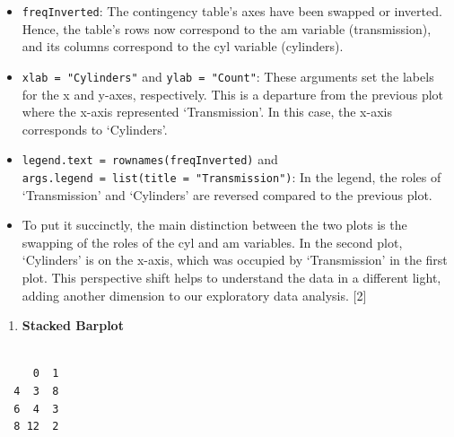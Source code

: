 \documentclass[
  letterpaper,
  DIV=11,
  numbers=noendperiod]{scrreport}
\newenvironment{Shaded}{\begin{snugshade}}{\end{snugshade}}
\newcommand{\CommentTok}[1]{\textcolor[rgb]{0.37,0.37,0.37}{#1}}
\newcommand{\FunctionTok}[1]{\textcolor[rgb]{0.28,0.35,0.67}{#1}}
\newcommand{\NormalTok}[1]{\textcolor[rgb]{0.00,0.23,0.31}{#1}}
\newcommand{\OtherTok}[1]{\textcolor[rgb]{0.00,0.23,0.31}{#1}}
\newcommand{\SpecialCharTok}[1]{\textcolor[rgb]{0.37,0.37,0.37}{#1}}
\providecommand{\tightlist}{%
  \setlength{\itemsep}{0pt}\setlength{\parskip}{0pt}}\usepackage{longtable,booktabs,array}
\begin{document}
\begin{itemize}
\item
  \texttt{freqInverted}: The contingency table's axes have been swapped
  or inverted. Hence, the table's rows now correspond to the am variable
  (transmission), and its columns correspond to the cyl variable
  (cylinders).
\item
  \texttt{xlab\ =\ "Cylinders"} and \texttt{ylab\ =\ "Count"}: These
  arguments set the labels for the x and y-axes, respectively. This is a
  departure from the previous plot where the x-axis represented
  `Transmission'. In this case, the x-axis corresponds to `Cylinders'.
\item
  \texttt{legend.text\ =\ rownames(freqInverted)} and
  \texttt{args.legend\ =\ list(title\ =\ "Transmission")}: In the
  legend, the roles of `Transmission' and `Cylinders' are reversed
  compared to the previous plot.
\item
  To put it succinctly, the main distinction between the two plots is
  the swapping of the roles of the cyl and am variables. In the second
  plot, `Cylinders' is on the x-axis, which was occupied by
  `Transmission' in the first plot. This perspective shift helps to
  understand the data in a different light, adding another dimension to
  our exploratory data analysis. {[}2{]}
\end{itemize}

\begin{enumerate}
\def\labelenumi{\arabic{enumi}.}
\setcounter{enumi}{4}
\tightlist
\item
  \textbf{Stacked Barplot}
\end{enumerate}

\begin{Shaded}
\end{Shaded}

\begin{verbatim}
   
     0  1
  4  3  8
  6  4  3
  8 12  2
\end{verbatim}
\end{document}
